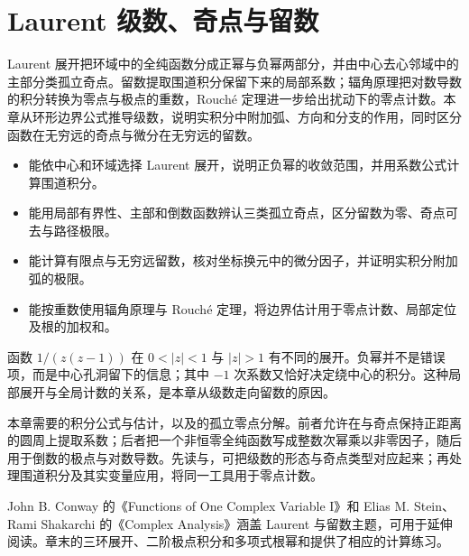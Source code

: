 \chapter{Laurent 级数、奇点与留数}
\label{b3:ch:03}
\begin{chapterabstract}
Laurent 展开把环域中的全纯函数分成正幂与负幂两部分，并由中心去心邻域中的主部分类孤立奇点。留数提取围道积分保留下来的局部系数；辐角原理把对数导数的积分转换为零点与极点的重数，Rouché 定理进一步给出扰动下的零点计数。本章从环形边界公式推导级数，说明实积分中附加弧、方向和分支的作用，同时区分函数在无穷远的奇点与微分在无穷远的留数。
\end{chapterabstract}

\begin{learninggoals}
\begin{itemize}
\item\label{b3:item:03-goal-1}能依中心和环域选择 Laurent 展开，说明正负幂的收敛范围，并用系数公式计算围道积分。
\item\label{b3:item:03-goal-2}能用局部有界性、主部和倒数函数辨认三类孤立奇点，区分留数为零、奇点可去与路径极限。
\item\label{b3:item:03-goal-3}能计算有限点与无穷远留数，核对坐标换元中的微分因子，并证明实积分附加弧的极限。
\item\label{b3:item:03-goal-4}能按重数使用辐角原理与 Rouché 定理，将边界估计用于零点计数、局部定位及根的加权和。
\end{itemize}
\end{learninggoals}

函数 \(1/(z(z-1))\) 在 \(0<|z|<1\) 与 \(|z|>1\) 有不同的展开。负幂并不是错误项，而是中心孔洞留下的信息；其中 \(-1\) 次系数又恰好决定绕中心的积分。这种局部展开与全局计数的关系，是本章从级数走向留数的原因。

\ProseParagraphBreak

本章需要的积分公式与估计，以及的孤立零点分解。前者允许在与奇点保持正距离的圆周上提取系数；后者把一个非恒零全纯函数写成整数次幂乘以非零因子，随后用于倒数的极点与对数导数。先读与，可把级数的形态与奇点类型对应起来；再处理围道积分及其实变量应用，将同一工具用于零点计数。

\ProseParagraphBreak

John B. Conway 的《Functions of One Complex Variable I》\cite{Conway1978Functions}和 Elias M. Stein、Rami Shakarchi 的《Complex Analysis》\cite{Stein2003Complex}涵盖 Laurent 与留数主题，可用于延伸阅读。章末的三环展开、二阶极点积分和多项式根幂和提供了相应的计算练习。

